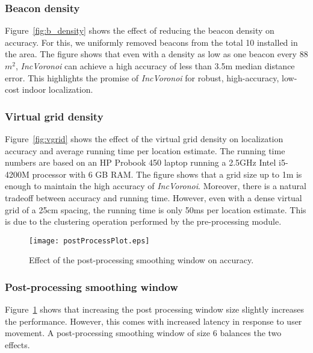 \documentclass[conference]{IEEEtran}
\def \sys {\textit{IncVoronoi}}
\begin{document}
\subsubsection{Beacon density}
Figure~\ref{fig:b_density} shows the effect of reducing the beacon density on accuracy. For this, we uniformly removed beacons from the total 10 installed in the area. The figure shows that even with a density as low as one beacon every 88 $m^2$, \sys{} can achieve a high accuracy of  less than 3.5m median distance error.
This highlights the promise of \sys{} for robust, high-accuracy, low-cost indoor localization. 

\subsubsection{Virtual grid density}
Figure~\ref{fig:vgrid} shows the effect of the virtual grid density on localization accuracy and average running time per location estimate.  The running time numbers are based on an HP Probook 450 laptop running a 2.5GHz Intel i5-4200M processor with 6 GB RAM. The figure shows that a grid size up to 1m is enough to maintain the high accuracy of \sys{}. Moreover, there is a natural tradeoff between accuracy and running time. However, even with a dense virtual grid of a 25cm spacing, the running time is only 50ms per location estimate. This is due to the clustering operation performed by the pre-processing module. 

\begin{figure}[!t]
\centering
\texttt{[image: postProcessPlot.eps]}
\caption{Effect of the post-processing smoothing window on accuracy.}
\label{fig:postproc}
\end{figure}
\subsubsection{Post-processing smoothing window}
Figure~\ref{fig:postproc} shows that increasing the post processing window size slightly increases the performance. However, this comes with increased latency in response to user movement. A post-processing smoothing window of size $6$ balances the two effects.
\end{document}
